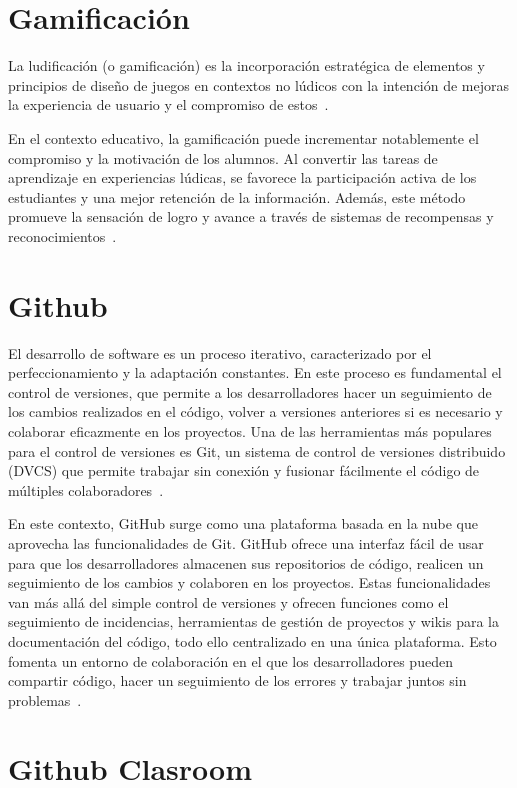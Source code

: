 \section{Gamificación}
La ludificación (o gamificación) es la incorporación estratégica de elementos y principios de diseño de juegos en contextos no lúdicos con la intención de mejoras la experiencia de usuario y el compromiso de estos~\cite{10.1145/1979742.1979575}.

En el contexto educativo, la gamificación puede incrementar notablemente el compromiso y la motivación de los alumnos. Al convertir las tareas de aprendizaje en experiencias lúdicas, se favorece la participación activa de los estudiantes y una mejor retención de la información. Además, este método promueve la sensación de logro y avance a través de sistemas de recompensas y reconocimientos~\cite{Tu2014, Barata2013, Lister2015}.

\section{Github}
El desarrollo de software es un proceso iterativo, caracterizado por el perfeccionamiento y la adaptación constantes.  En este proceso es fundamental el control de versiones, que permite a los desarrolladores hacer un seguimiento de los cambios realizados en el código, volver a versiones anteriores si es necesario y colaborar eficazmente en los proyectos.  Una de las herramientas más populares para el control de versiones es Git, un sistema de control de versiones distribuido (DVCS) que permite trabajar sin conexión y fusionar fácilmente el código de múltiples colaboradores~\cite{gitlabWhatVersion}.

En este contexto, GitHub surge como una plataforma basada en la nube que aprovecha las funcionalidades de Git.  GitHub ofrece una interfaz fácil de usar para que los desarrolladores almacenen sus repositorios de código, realicen un seguimiento de los cambios y colaboren en los proyectos.  Estas funcionalidades van más allá del simple control de versiones y ofrecen funciones como el seguimiento de incidencias, herramientas de gestión de proyectos y wikis para la documentación del código, todo ello centralizado en una única plataforma.  Esto fomenta un entorno de colaboración en el que los desarrolladores pueden compartir código, hacer un seguimiento de los errores y trabajar juntos sin problemas~\cite{githubAboutGitHub}.

\section{Github Clasroom}

